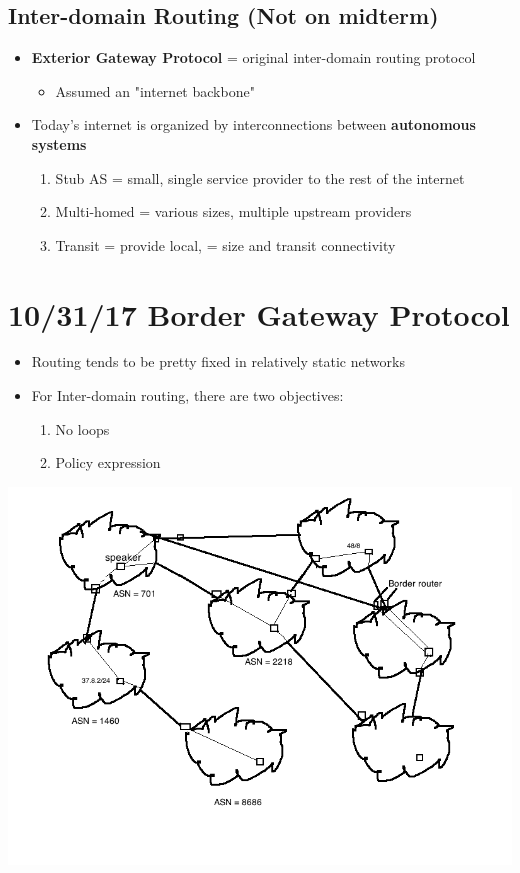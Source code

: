 \documentclass[11pt]{article}
\begin{document}
\subsection{Inter-domain Routing (Not on midterm)}
\label{sec:orgheadline91}
\begin{itemize}
\item \textbf{Exterior Gateway Protocol} = original inter-domain routing protocol
\begin{itemize}
\item Assumed an "internet backbone"
\end{itemize}

\item Today's internet is organized by interconnections between
\textbf{autonomous systems}
\begin{enumerate}
\item Stub AS = small, single service provider to the rest of the
internet
\item Multi-homed = various sizes, multiple upstream providers
\item Transit = provide local, = size and transit connectivity
\end{enumerate}
\end{itemize}

\section{10/31/17  Border Gateway Protocol}
\label{sec:orgheadline97}
\begin{itemize}
\item Routing tends to be pretty fixed in relatively static networks
\item For Inter-domain routing, there are two objectives:
\begin{enumerate}
\item No loops
\item Policy expression
\end{enumerate}
\end{itemize}
\includegraphics[width=.9\linewidth]{diagrams/bgp1.png}
\end{document}
